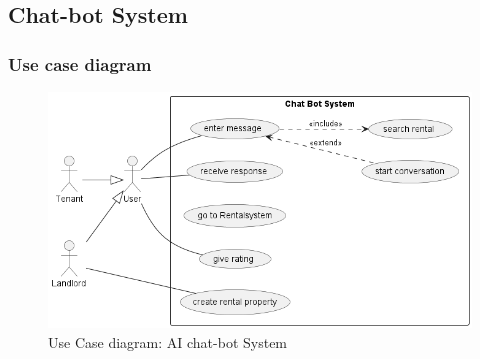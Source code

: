 \newpage
\subsection{Chat-bot System}
\subsubsection{Use case diagram}
\begin{figure}[H]
    \centering
    \includegraphics[width = \textwidth]{Images/chat_bot.png}
    \caption{Use Case diagram: AI chat-bot System}
    \label{fig:usecase-diagram-AI-system}
\end{figure}

\newpage
